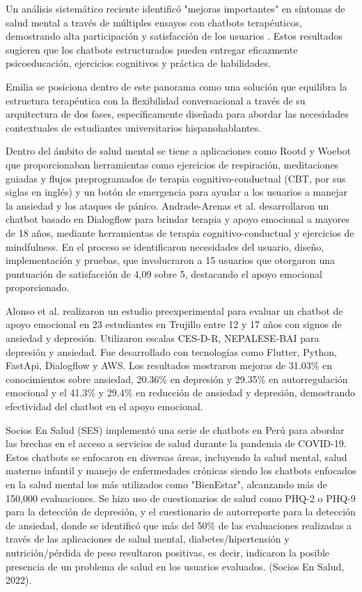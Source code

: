 \documentclass[conference]{IEEEtran}
\begin{document}
Un análisis sistemático reciente identificó "mejoras importantes" en síntomas de salud mental a través de múltiples ensayos con chatbots terapéuticos, demostrando alta participación y satisfacción de los usuarios \cite{b23}. Estos resultados sugieren que los chatbots estructurados pueden entregar eficazmente psicoeducación, ejercicios cognitivos y práctica de habilidades.

Emilia se posiciona dentro de este panorama como una solución que equilibra la estructura terapéutica con la flexibilidad conversacional a través de su arquitectura de dos fases, específicamente diseñada para abordar las necesidades contextuales de estudiantes universitarios hispanohablantes.

Dentro del ámbito de salud mental se tiene a aplicaciones como Rootd \cite{b8} y Woebot \cite{b9} que proporcionaban herramientas como ejercicios de respiración, meditaciones guiadas y flujos preprogramados de terapia cognitivo-conductual (CBT, por sus siglas en inglés) y un botón de emergencia para ayudar a los usuarios a manejar la ansiedad y los ataques de pánico.
Andrade-Arenas et al. \cite{b10} desarrollaron un chatbot basado en Dialogflow para brindar terapia y apoyo emocional a mayores de 18 años, mediante herramientas de terapia cognitivo-conductual y ejercicios de mindfulness. En el proceso se identificaron necesidades del usuario, diseño, implementación y pruebas, que involucraron a 15 usuarios que otorgaron una puntuación de satisfacción de 4,09 sobre 5, destacando el apoyo emocional proporcionado.

Alonso et al. \cite{b11} realizaron un estudio preexperimental para evaluar un chatbot de apoyo emocional en 23 estudiantes en Trujillo entre 12 y 17 años con signos de ansiedad y depresión. Utilizaron escalas CES-D-R, NEPALESE-BAI para depresión y ansiedad. Fue desarrollado con tecnologías como Flutter, Python, FastApi, Dialogflow y AWS. Los resultados mostraron mejoras de 31.03\% en conocimientos sobre ansiedad, 20.36\% en depresión y 29.35\% en autorregulación emocional y el 41.3\% y 29.4\% en reducción de ansiedad y depresión, demostrando efectividad del chatbot en el apoyo emocional.

Socios En Salud (SES) implementó una serie de chatbots en Perú para abordar las brechas en el acceso a servicios de salud durante la pandemia de COVID-19. Estos chatbots se enfocaron en diversas áreas, incluyendo la salud mental, salud materno infantil y manejo de enfermedades crónicas siendo los chatbots enfocados en la salud mental los más utilizados como "BienEstar", alcanzando más de 150,000 evaluaciones. Se hizo uso de cuestionarios de salud como PHQ-2 o PHQ-9 para la detección de depresión, y el cuestionario de autorreporte para la detección de ansiedad, donde se identificó que más del 50\% de las evaluaciones realizadas a través de las aplicaciones de salud mental, diabetes/hipertensión y nutrición/pérdida de peso resultaron positivas, es decir, indicaron la posible presencia de un problema de salud en los usuarios evaluados. (Socios En Salud, 2022).\cite{b12}
\end{document}
